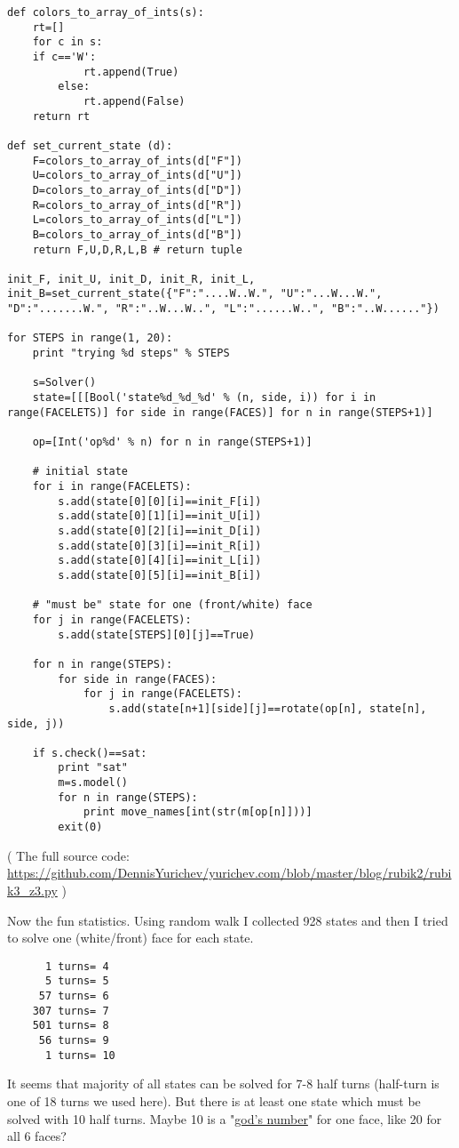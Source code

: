 \begin{lstlisting}
def colors_to_array_of_ints(s):
    rt=[]
    for c in s:
	if c=='W':
            rt.append(True)
        else:
            rt.append(False)
    return rt

def set_current_state (d):
    F=colors_to_array_of_ints(d["F"])
    U=colors_to_array_of_ints(d["U"])
    D=colors_to_array_of_ints(d["D"])
    R=colors_to_array_of_ints(d["R"])
    L=colors_to_array_of_ints(d["L"])
    B=colors_to_array_of_ints(d["B"])
    return F,U,D,R,L,B # return tuple

init_F, init_U, init_D, init_R, init_L, init_B=set_current_state({"F":"....W..W.", "U":"...W...W.", "D":".......W.", "R":"..W...W..", "L":"......W..", "B":"..W......"})

for STEPS in range(1, 20):
	print "trying %d steps" % STEPS

	s=Solver()
	state=[[[Bool('state%d_%d_%d' % (n, side, i)) for i in range(FACELETS)] for side in range(FACES)] for n in range(STEPS+1)]

	op=[Int('op%d' % n) for n in range(STEPS+1)]

	# initial state
	for i in range(FACELETS):
		s.add(state[0][0][i]==init_F[i])
		s.add(state[0][1][i]==init_U[i])
		s.add(state[0][2][i]==init_D[i])
		s.add(state[0][3][i]==init_R[i])
		s.add(state[0][4][i]==init_L[i])
		s.add(state[0][5][i]==init_B[i])

	# "must be" state for one (front/white) face
	for j in range(FACELETS):
		s.add(state[STEPS][0][j]==True)

	for n in range(STEPS):
		for side in range(FACES):
			for j in range(FACELETS):
				s.add(state[n+1][side][j]==rotate(op[n], state[n], side, j))

	if s.check()==sat:
		print "sat"
		m=s.model()
		for n in range(STEPS):
			print move_names[int(str(m[op[n]]))]
		exit(0)
\end{lstlisting}

( The full source code: \url{https://github.com/DennisYurichev/yurichev.com/blob/master/blog/rubik2/rubik3_z3.py} )

Now the fun statistics.
Using random walk I collected 928 states and then I tried to solve one (white/front) face for each state.

\begin{lstlisting}
      1 turns= 4
      5 turns= 5
     57 turns= 6
    307 turns= 7
    501 turns= 8
     56 turns= 9
      1 turns= 10
\end{lstlisting}

It seems that majority of all states can be solved for 7-8 half turns (half-turn is one of 18 turns we used here).
But there is at least one state which must be solved with 10 half turns.
Maybe 10 is a "\href{http://www.cube20.org/}{god’s number}" for one face, like 20 for all 6 faces?

